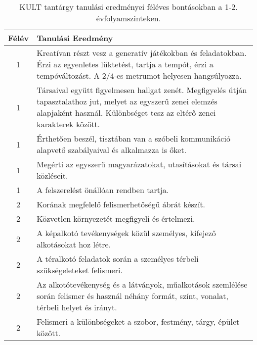       
           \begin{longtable}{c | p{12cm} }
            \caption[KULT 1-2.]{KULT tantárgy tanulási eredményei féléves bontásokban a 1-2. évfolyamszinteken. }  \\

            \textbf{Félév} & \textbf{Tanulási Eredmény} \\
            \hline
            \endhead
                                
                                      
                                
                                          1 &  Kreatívan részt vesz a generatív játékokban és feladatokban. Érzi az egyenletes lüktetést, tartja a tempót, érzi a tempóváltozást. A 2/4-es metrumot helyesen hangsúlyozza. \\ \hline
                                          1 &  Társaival együtt figyelmesen hallgat zenét. Megfigyelés útján tapasztalathoz jut, melyet az egyszerű zenei elemzés alapjaként használ. Különbséget tesz az eltérő zenei karakterek között. \\ \hline
                                          1 &  Érthetően beszél, tisztában van a szóbeli kommunikáció alapvető szabályaival és alkalmazza is őket. \\ \hline
                                          1 &  Megérti az egyszerű magyarázatokat, utasításokat és társai közléseit. \\ \hline
                                          1 &  A felszerelést önállóan rendben tartja. \\ \hline
                                      
                                
                                          2 &  Korának megfelelő felismerhetőségű ábrát készít. \\ \hline
                                          2 &  Közvetlen környezetét megfigyeli és értelmezi. \\ \hline
                                          2 &  A képalkotó tevékenységek közül személyes, kifejező alkotásokat hoz létre. \\ \hline
                                          2 &  A téralkotó feladatok során a személyes térbeli szükségeleteket felismeri. \\ \hline
                                          2 &  Az alkotótevékenység és a látványok, műalkotások szemlélése során felismer és használ néhány formát, színt, vonalat, térbeli helyet és irányt. \\ \hline
                                          2 &  Felismeri a különbségeket a szobor, festmény, tárgy, épület között. \\ \hline
                                      

\end{longtable}
